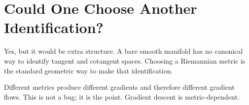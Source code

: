 \documentclass[11pt]{article}
\begin{document}
\section*{Could One Choose Another Identification?}

Yes, but it would be extra structure. A bare smooth manifold has no canonical
way to identify tangent and cotangent spaces. Choosing a Riemannian metric is
the standard geometric way to make that identification.

Different metrics produce different gradients and therefore different gradient
flows. This is not a bug; it is the point. Gradient descent is metric-dependent.
\end{document}
